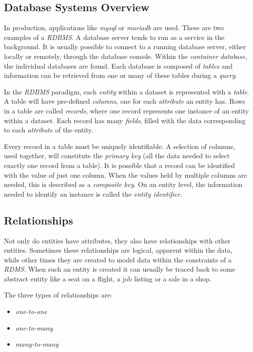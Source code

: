 \documentclass[10pt]{article}
\begin{document}
\subsection{Database Systems Overview}
\label{sec:org92e8d2a}

In production, applications like \emph{mysql} or \emph{mariadb} are used. These are two examples of a \emph{RDBMS}. A database server tends to run as a service in the background. It is usually possible to connect to a running database server, either locally or remotely, through the database console. Within the \emph{container database}, the individual databases are found. Each database is composed of \emph{tables} and information can be retrieved from one or many of these tables during a \emph{query}.

In the \emph{RDBMS} paradigm, each \emph{entity} within a dataset is represented with a \emph{table}. A table will have pre-defined \emph{columns}, one for each \emph{attribute} an entity has. Rows in a table are called \emph{records}, where one record represents one instance of an entity within a dataset. Each record has many \emph{fields}, filled with the data corresponding to each \emph{attribute} of the entity.

Every record in a table must be uniquely identifiable. A selection of columns, used together, will constitute the \emph{primary key} (all the data needed to select exactly one record from a table). It is possible that a record can be identified with the value of just one column. When the values held by multiple columns are needed, this is described as a \emph{composite key}. On an entity level, the information needed to identify an instance is called the \emph{entity identifier.}

\subsection{Relationships}
\label{sec:orgef868e3}

Not only do entities have attributes, they also have relationships with other entities. Sometimes these relationships are logical, apparent within the data, while other times they are created to model data within the constraints of a \emph{RDMS}. When such an entity is created it can usually be traced back to some abstract entity like a seat on a flight, a job listing or a sale in a shop.

The three types of relationships are:

\begin{itemize}
\item \emph{one-to-one}
\item \emph{one-to-many}
\item \emph{many-to-many}
\end{itemize}
\end{document}
